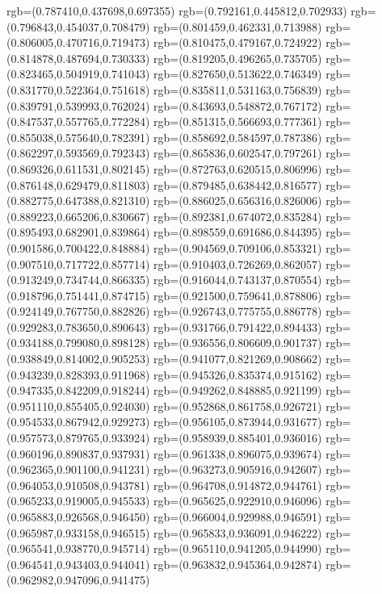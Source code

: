 {{{			rgb=(0.787410,0.437698,0.697355)
			rgb=(0.792161,0.445812,0.702933)
			rgb=(0.796843,0.454037,0.708479)
			rgb=(0.801459,0.462331,0.713988)
			rgb=(0.806005,0.470716,0.719473)
			rgb=(0.810475,0.479167,0.724922)
			rgb=(0.814878,0.487694,0.730333)
			rgb=(0.819205,0.496265,0.735705)
			rgb=(0.823465,0.504919,0.741043)
			rgb=(0.827650,0.513622,0.746349)
			rgb=(0.831770,0.522364,0.751618)
			rgb=(0.835811,0.531163,0.756839)
			rgb=(0.839791,0.539993,0.762024)
			rgb=(0.843693,0.548872,0.767172)
			rgb=(0.847537,0.557765,0.772284)
			rgb=(0.851315,0.566693,0.777361)
			rgb=(0.855038,0.575640,0.782391)
			rgb=(0.858692,0.584597,0.787386)
			rgb=(0.862297,0.593569,0.792343)
			rgb=(0.865836,0.602547,0.797261)
			rgb=(0.869326,0.611531,0.802145)
			rgb=(0.872763,0.620515,0.806996)
			rgb=(0.876148,0.629479,0.811803)
			rgb=(0.879485,0.638442,0.816577)
			rgb=(0.882775,0.647388,0.821310)
			rgb=(0.886025,0.656316,0.826006)
			rgb=(0.889223,0.665206,0.830667)
			rgb=(0.892381,0.674072,0.835284)
			rgb=(0.895493,0.682901,0.839864)
			rgb=(0.898559,0.691686,0.844395)
			rgb=(0.901586,0.700422,0.848884)
			rgb=(0.904569,0.709106,0.853321)
			rgb=(0.907510,0.717722,0.857714)
			rgb=(0.910403,0.726269,0.862057)
			rgb=(0.913249,0.734744,0.866335)
			rgb=(0.916044,0.743137,0.870554)
			rgb=(0.918796,0.751441,0.874715)
			rgb=(0.921500,0.759641,0.878806)
			rgb=(0.924149,0.767750,0.882826)
			rgb=(0.926743,0.775755,0.886778)
			rgb=(0.929283,0.783650,0.890643)
			rgb=(0.931766,0.791422,0.894433)
			rgb=(0.934188,0.799080,0.898128)
			rgb=(0.936556,0.806609,0.901737)
			rgb=(0.938849,0.814002,0.905253)
			rgb=(0.941077,0.821269,0.908662)
			rgb=(0.943239,0.828393,0.911968)
			rgb=(0.945326,0.835374,0.915162)
			rgb=(0.947335,0.842209,0.918244)
			rgb=(0.949262,0.848885,0.921199)
			rgb=(0.951110,0.855405,0.924030)
			rgb=(0.952868,0.861758,0.926721)
			rgb=(0.954533,0.867942,0.929273)
			rgb=(0.956105,0.873944,0.931677)
			rgb=(0.957573,0.879765,0.933924)
			rgb=(0.958939,0.885401,0.936016)
			rgb=(0.960196,0.890837,0.937931)
			rgb=(0.961338,0.896075,0.939674)
			rgb=(0.962365,0.901100,0.941231)
			rgb=(0.963273,0.905916,0.942607)
			rgb=(0.964053,0.910508,0.943781)
			rgb=(0.964708,0.914872,0.944761)
			rgb=(0.965233,0.919005,0.945533)
			rgb=(0.965625,0.922910,0.946096)
			rgb=(0.965883,0.926568,0.946450)
			rgb=(0.966004,0.929988,0.946591)
			rgb=(0.965987,0.933158,0.946515)
			rgb=(0.965833,0.936091,0.946222)
			rgb=(0.965541,0.938770,0.945714)
			rgb=(0.965110,0.941205,0.944990)
			rgb=(0.964541,0.943403,0.944041)
			rgb=(0.963832,0.945364,0.942874)
			rgb=(0.962982,0.947096,0.941475)
}}}
